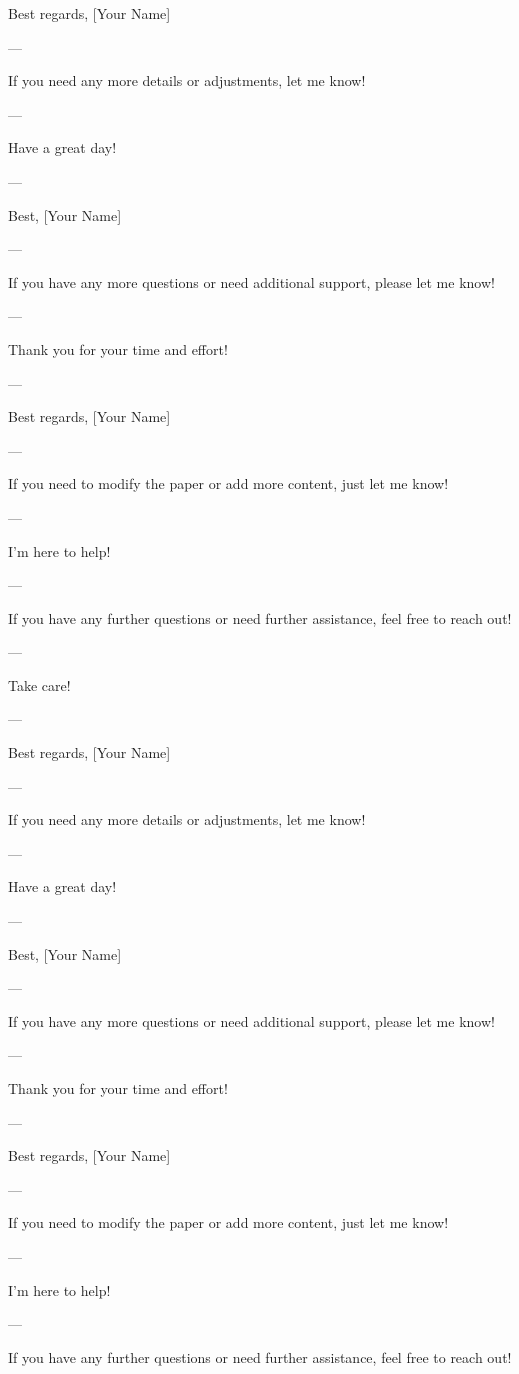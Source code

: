 Best regards,  
[Your Name] 

--- 

If you need any more details or adjustments, let me know! 

--- 

Have a great day! 

--- 

Best,  
[Your Name] 

--- 

If you have any more questions or need additional support, please let me know! 

--- 

Thank you for your time and effort! 

--- 

Best regards,  
[Your Name] 

--- 

If you need to modify the paper or add more content, just let me know! 

--- 

I'm here to help! 

--- 

If you have any further questions or need further assistance, feel free to reach out! 

--- 

Take care! 

--- 

Best regards,  
[Your Name] 

--- 

If you need any more details or adjustments, let me know! 

--- 

Have a great day! 

--- 

Best,  
[Your Name] 

--- 

If you have any more questions or need additional support, please let me know! 

--- 

Thank you for your time and effort! 

--- 

Best regards,  
[Your Name] 

--- 

If you need to modify the paper or add more content, just let me know! 

--- 

I'm here to help! 

--- 

If you have any further questions or need further assistance, feel free to reach out! 

